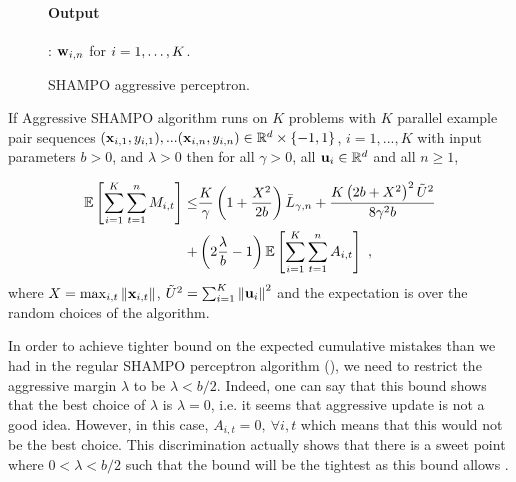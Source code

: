 {\begin{figure}[h]
\paragraph{Output}: $\mathbf{w}_{i,n}$ for $i=1 , \ldots , K$.
\caption{SHAMPO aggressive perceptron. \label{alg:SHAMPO_FO}}
\end{figure}        


\begin{theorem}
  If Aggressive SHAMPO algorithm runs on $K$ problems with $K$ parallel example pair
  sequences
  $(\mathbf{x}_{i,1},y_{i,1}),...(\mathbf{x}_{i,n},y_{i,n})\in\mathbb{R}^d\times\{-1,1\}$,
  $i=1,...,K$ with input parameters $b>0$, and $\lambda>0$ then for all $\gamma>0$, all
  $\mathbf{u}_{i}\in\mathbb{R}^d$ and all $n\ge1$,
  
\begin{displaymath}
\begin{split}
\mathbb{E}\left[ \sum_{i=1}^{K}\sum_{t=1}^{n}{M_{i,t}} \right]
\le& \frac{K}{\gamma}\left(1+\frac{X^2}{2b} \right){\bar L}_{\gamma,n}+
\frac{K\left({2b+X^2}\right)^2\tilde{U}^2}{8{\gamma}^2b}\\ 
+&\left({2\frac{\lambda}{b}-1}\right)\mathbb{E}\left[{\sum_{i=1}^{K}\sum_{t=1}^{n}{A_{i,t}}}\right]~,
\label{bound_aggressive_FO_SHAMPO}
\end{split}
\end{displaymath}
 where $X=\max_{i,t}\Vert\mathbf{x}_{i,t}\Vert$,
$\tilde{U}^2=\sum_{i=1}^{K}\left\Vert {\mathbf{u}_{i}} \right\Vert^2$ and the expectation is over the
random choices of the algorithm.
\end{theorem} \label{thm:FO_bound_aggressive}

In order to achieve tighter bound on the expected cumulative mistakes than we had in the regular SHAMPO perceptron algorithm (), we need to restrict the aggressive margin  $\lambda$ to be $\lambda<b/2$. Indeed, one can say that this bound shows that the best choice of $\lambda$ is $\lambda=0$, i.e. it seems that aggressive update is not a good idea. However, in this case, $A_{i,t}=0,~ \forall i,t$ which means that this would not be the best choice. This discrimination actually shows  that there is a sweet point where $0<\lambda<b/2$ such that the bound will be the  tightest as this bound allows . 
\\

}

